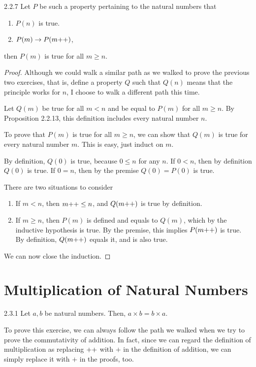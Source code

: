 \begin{exercise}{2.2.7}
		Let $P$ be such a property pertaining to the natural numbers that
		\begin{enumerate}
			\item $P(n)$ is true.
			\item $P(m) \to P(m{+}{+})$,
		\end{enumerate}
		then $P(m)$ is true for all $m \ge n$.
\end{exercise}
\begin{proof}
	Although we could walk a similar path as we walked to prove the previous two exercises, that is, define a property $Q$ such that $Q(n)$ means that the principle works for $n$, I choose to walk a different path this time.

	Let $Q(m)$ be true for all $m < n$ and be equal to $P(m)$ for all $m \ge n$. By Proposition 2.2.13, this definition includes every natural number $n$.
	
	To prove that $P(m)$ is true for all $m \ge n$, we can show that $Q(m)$ is true for every natural number $m$. This is easy, just induct on $m$.
	
	\mybcbox 
	By definition, $Q(0)$ is true, because $0 \le n$ for any $n$. If $0 < n$, then by definition $Q(0)$ is true. If $0 = n$, then by the premise $Q(0) = P(0)$ is true.

	\myisbox 
	There are two situations to consider
\begin{enumerate}
	\item If $m < n$, then $m{+}{+} \le n$, and $Q(m{+}{+})$ is true by definition.
	\item If $m \ge n$, then $P(m)$ is defined and equals to $Q(m)$, which by the inductive hypothesis is true. By the premise, this implies $P(m{+}{+})$ is true. By definition, $Q(m{+}{+})$ equals it, and is also true.
\end{enumerate}

We can now close the induction.
\end{proof}

\section{Multiplication of Natural Numbers}
\begin{exercise}{2.3.1}
	Let $a,b$ be natural numbers. Then, $a \times b = b \times a$.
\end{exercise}
To prove this exercise, we can always follow the path we walked when we try to prove the commutativity of addition. In fact, since we can regard the definition of multiplication as replacing ${+}{+}$ with $+$ in the definition of addition, we can simply replace it with $+$ in the proofs, too.

